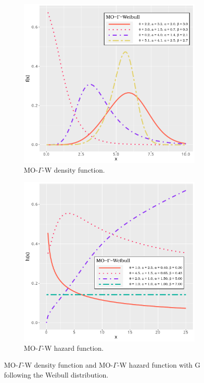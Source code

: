 \documentclass[twoside,leqno,11pt]{article}
\begin{document}
\begin{figure}
	\centering
	\begin{subfigure}[b]{0.49\textwidth}
		\centering
		\includegraphics[width=\textwidth]{pdf_function.pdf}
		\caption{MO-$\Gamma$-W density function.}
		\label{fig:pdf}
	\end{subfigure}
	\hfill
	\begin{subfigure}[b]{0.49\textwidth}
		\centering
		\includegraphics[width=\textwidth]{hazard_function.pdf}
		\caption{MO-$\Gamma$-W hazard function.}
		\label{fig:hazard}
	\end{subfigure}
\caption{MO-$\Gamma$-W density function and  MO-$\Gamma$-W hazard function with G following the Weibull distribution.}
\label{formas}
\end{figure}
\end{document}
